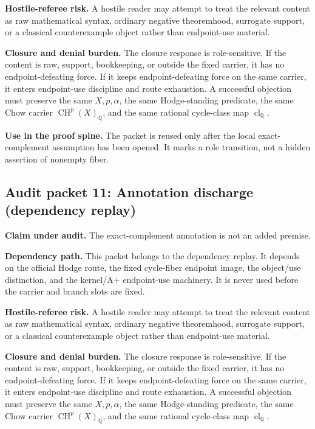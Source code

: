 \documentclass[11pt]{article}
\newcommand{\QQ}{\mathbb{Q}}
\newcommand{\CH}{\operatorname{CH}}
\newcommand{\clQ}{\operatorname{cl}_{\QQ}}
\begin{document}
\par\noindent\textbf{Hostile-referee risk.} A hostile reader may attempt to treat the relevant content as raw mathematical syntax, ordinary negative theoremhood, surrogate support, or a classical counterexample object rather than endpoint-use material.


\par\noindent\textbf{Closure and denial burden.} The closure response is role-sensitive. If the content is raw, support, bookkeeping, or outside the fixed carrier, it has no endpoint-defeating force. If it keeps endpoint-defeating force on the same carrier, it enters endpoint-use discipline and route exhaustion. A successful objection must preserve the same $X,p,\alpha$, the same Hodge-standing predicate, the same Chow carrier $\CH^p(X)_\QQ$, and the same rational cycle-class map $\clQ$.


\par\noindent\textbf{Use in the proof spine.} The packet is reused only after the local exact-complement assumption has been opened. It marks a role transition, not a hidden assertion of nonempty fiber.


\subsection{Audit packet 11: Annotation discharge (dependency replay)}


\par\noindent\textbf{Claim under audit.} The exact-complement annotation is not an added premise.


\par\noindent\textbf{Dependency path.} This packet belongs to the dependency replay. It depends on the official Hodge route, the fixed cycle-fiber endpoint image, the object/use distinction, and the kernel/A+ endpoint-use machinery. It is never used before the carrier and branch slots are fixed.


\par\noindent\textbf{Hostile-referee risk.} A hostile reader may attempt to treat the relevant content as raw mathematical syntax, ordinary negative theoremhood, surrogate support, or a classical counterexample object rather than endpoint-use material.


\par\noindent\textbf{Closure and denial burden.} The closure response is role-sensitive. If the content is raw, support, bookkeeping, or outside the fixed carrier, it has no endpoint-defeating force. If it keeps endpoint-defeating force on the same carrier, it enters endpoint-use discipline and route exhaustion. A successful objection must preserve the same $X,p,\alpha$, the same Hodge-standing predicate, the same Chow carrier $\CH^p(X)_\QQ$, and the same rational cycle-class map $\clQ$.
\end{document}
